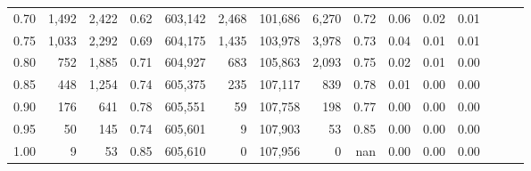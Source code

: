 \begin{tabular}{rrrrrrrrrrrrrrr}
0.70 &    1,492 &   2,422 &  0.62 &  603,142 &    2,468 &  101,686 &    6,270 &  0.72 &  0.06 &  0.02 &      0.01 \\
0.75 &    1,033 &   2,292 &  0.69 &  604,175 &    1,435 &  103,978 &    3,978 &  0.73 &  0.04 &  0.01 &      0.01 \\
0.80 &      752 &   1,885 &  0.71 &  604,927 &      683 &  105,863 &    2,093 &  0.75 &  0.02 &  0.01 &      0.00 \\
0.85 &      448 &   1,254 &  0.74 &  605,375 &      235 &  107,117 &      839 &  0.78 &  0.01 &  0.00 &      0.00 \\
0.90 &      176 &     641 &  0.78 &  605,551 &       59 &  107,758 &      198 &  0.77 &  0.00 &  0.00 &      0.00 \\
0.95 &       50 &     145 &  0.74 &  605,601 &        9 &  107,903 &       53 &  0.85 &  0.00 &  0.00 &      0.00 \\
1.00 &        9 &      53 &  0.85 &  605,610 &        0 &  107,956 &        0 &   nan &  0.00 &  0.00 &      0.00 \\
\bottomrule
\end{tabular}

